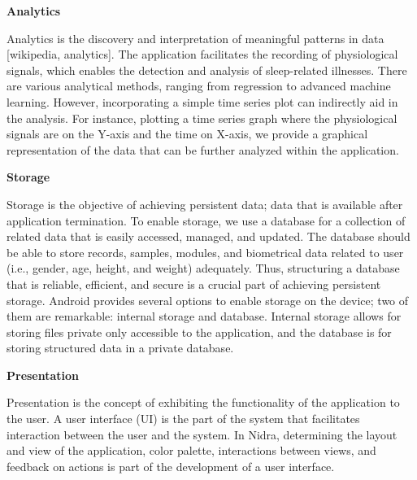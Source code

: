 \noindent \textbf{Analytics}

\noindent Analytics is the discovery and interpretation of meaningful patterns in data [wikipedia, analytics]. The application facilitates the recording of physiological signals, which enables the detection and analysis of sleep-related illnesses. There are various analytical methods, ranging from regression to advanced machine learning. However, incorporating a simple time series plot can indirectly aid in the analysis. For instance, plotting a time series graph where the physiological signals are on the Y-axis and the time on X-axis, we provide a graphical representation of the data that can be further analyzed within the application.

\noindent \textbf{Storage}

\noindent Storage is the objective of achieving persistent data; data that is available after application termination. To enable storage, we use a database for a collection of related data that is easily accessed, managed, and updated. The database should be able to store records, samples, modules, and biometrical data related to user (i.e., gender, age, height, and weight) adequately. Thus, structuring a database that is reliable, efficient, and secure is a crucial part of achieving persistent storage. Android provides several options to enable storage on the device; two of them are remarkable: internal storage and database. Internal storage allows for storing files private only accessible to the application, and the database is for storing structured data in a private database. 

\noindent \textbf{Presentation}

\noindent Presentation is the concept of exhibiting the functionality of the application to the user. A user interface (UI) is the part of the system that facilitates interaction between the user and the system. In Nidra, determining the layout and view of the application, color palette, interactions between views, and feedback on actions is part of the development of a user interface. 